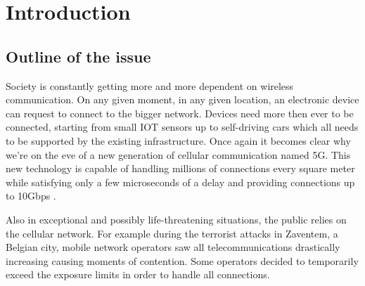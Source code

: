 %

\chapter{Introduction}
\label{chap:intro}

\section{Outline of the issue} %
\label{sec:issue}

Society is constantly getting more and more dependent on wireless communication. On any given moment, in any given location, an electronic device
can request to connect to the bigger network. Devices need more then ever to be connected, starting from small IOT sensors up to self-driving cars
which all needs to be supported by the existing infrastructure. Once again it becomes clear why we're on the eve of a new generation of cellular communication named 5G. 
This new technology is capable of handling millions of connections every square meter %
while satisfying only a few microseconds of a delay and providing connections up to 10Gbps \cite{5GFeatures}.

Also in exceptional and possibly life-threatening situations, the public relies on the cellular network. For example during the terrorist attacks in Zaventem, a Belgian city,
mobile network operators saw all telecommunications drastically increasing causing moments of contention. Some operators decided to temporarily exceed the exposure limits in
order to handle all connections. \cite{baseZaventem}

